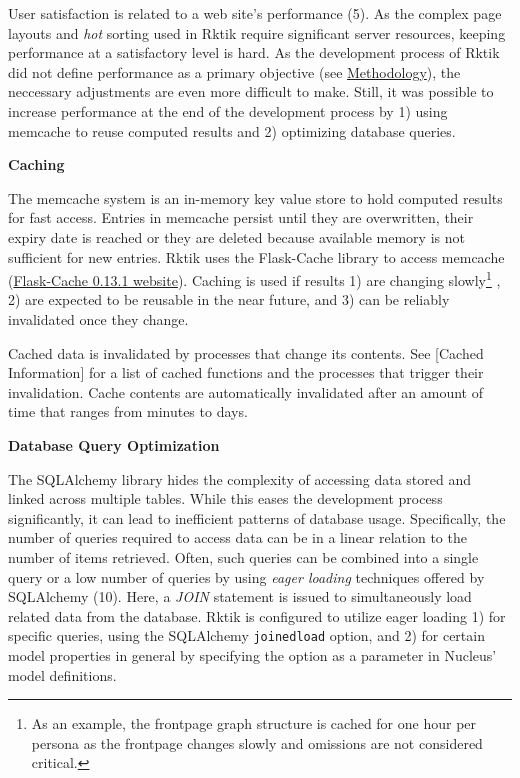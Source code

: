 
User satisfaction is related to a web site's performance (5). As the
complex page layouts and \emph{hot} sorting used in Rktik require
significant server resources, keeping performance at a satisfactory
level is hard. As the development process of Rktik did not define
performance as a primary objective (see
\hyperref[methodology]{Methodology}), the neccessary adjustments are
even more difficult to make. Still, it was possible to increase
performance at the end of the development process by 1) using memcache
to reuse computed results and 2) optimizing database queries.

\textbf{Caching}

The memcache system is an in-memory key value store to hold computed
results for fast access. Entries in memcache persist until they are
overwritten, their expiry date is reached or they are deleted because
available memory is not sufficient for new entries. Rktik uses the
Flask-Cache library to access memcache
(\href{https://pypi.python.org/pypi/Flask-Cache/0.13.1}{Flask-Cache
0.13.1 website}). Caching is used if results 1) are changing
slowly\footnote{As an example, the frontpage graph structure is cached
  for one hour per persona as the frontpage changes slowly and omissions
  are not considered critical.} , 2) are expected to be reusable in the
near future, and 3) can be reliably invalidated once they change.

Cached data is invalidated by processes that change its contents. See
{[}Cached Information{]} for a list of cached functions and the
processes that trigger their invalidation. Cache contents are
automatically invalidated after an amount of time that ranges from
minutes to days.

\textbf{Database Query Optimization}

The SQLAlchemy library hides the complexity of accessing data stored and
linked across multiple tables. While this eases the development process
significantly, it can lead to inefficient patterns of database usage.
Specifically, the number of queries required to access data can be in a
linear relation to the number of items retrieved. Often, such queries
can be combined into a single query or a low number of queries by using
\emph{eager loading} techniques offered by SQLAlchemy (10). Here, a
\emph{JOIN} statement is issued to simultaneously load related data from
the database. Rktik is configured to utilize eager loading 1) for
specific queries, using the SQLAlchemy \texttt{joinedload} option, and
2) for certain model properties in general by specifying the option as a
parameter in Nucleus' model definitions.

